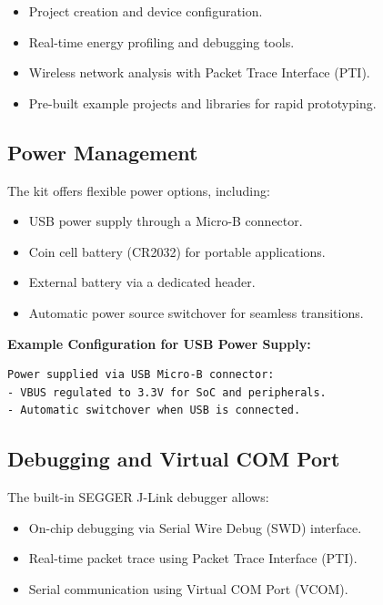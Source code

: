 \documentclass[
  9pt,
  letterpaper,
  abstract,
  titlepage]{scrbook}
\begin{document}
\begin{itemize}
\item
  Project creation and device configuration.
\item
  Real-time energy profiling and debugging tools.
\item
  Wireless network analysis with Packet Trace Interface (PTI).
\item
  Pre-built example projects and libraries for rapid prototyping.
\end{itemize}

\subsection{Power Management}\label{power-management}

The kit offers flexible power options, including:

\begin{itemize}
\item
  USB power supply through a Micro-B connector.
\item
  Coin cell battery (CR2032) for portable applications.
\item
  External battery via a dedicated header.
\item
  Automatic power source switchover for seamless transitions.
\end{itemize}

\textbf{Example Configuration for USB Power Supply:}

\begin{verbatim}
Power supplied via USB Micro-B connector:
- VBUS regulated to 3.3V for SoC and peripherals.
- Automatic switchover when USB is connected.
\end{verbatim}

\subsection{Debugging and Virtual COM
Port}\label{debugging-and-virtual-com-port}

The built-in SEGGER J-Link debugger allows:

\begin{itemize}
\item
  On-chip debugging via Serial Wire Debug (SWD) interface.
\item
  Real-time packet trace using Packet Trace Interface (PTI).
\item
  Serial communication using Virtual COM Port (VCOM).
\end{itemize}
\end{document}
